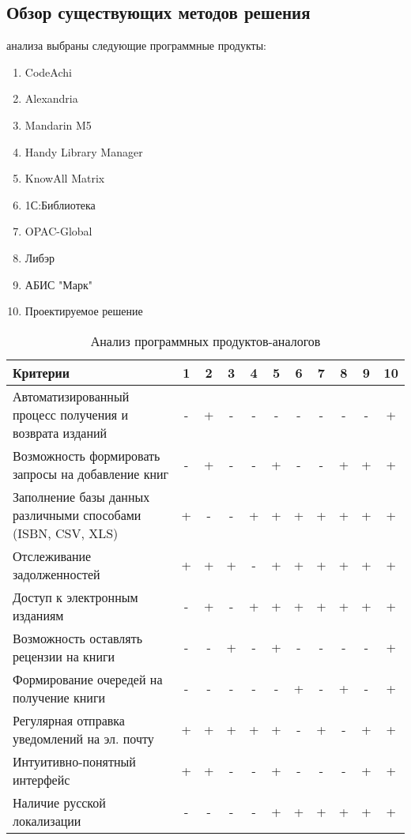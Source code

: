 \documentclass[./intro.tex]{subfiles}
\begin{document}
\subsection{Обзор существующих методов решения}
 анализа выбраны следующие программные продукты:
\begin{enumerate}
    \item CodeAchi \cite{Codeachi}
    \item Alexandria \cite{Alexandria}
    \item Mandarin M5 \cite{Mandarin}
    \item Handy Library Manager \cite{Handy}
    \item KnowAll Matrix \cite{KnowAll}
    \item 1С:Библиотека \cite{1C}
    \item OPAC-Global \cite{OPAC}
    \item Либэр \cite{Liber}
    \item АБИС "Марк" \cite{ABISmark}
    \item Проектируемое решение
\end{enumerate}

\begin{table}[h]
    \caption{Анализ программных продуктов-аналогов}
    \label{table:1}
    \begin{tabular}{|p{8.5cm}|c|c|c|c|c|c|c|c|c|c|}
        \hline
        Критерии & 1 & 2 & 3 & 4 & 5 & 6 & 7 & 8 & 9 & 10\\
        \hline
        Автоматизированный процесс получения и возврата изданий & - & + & - & - & - & - & - & - & - & + \\
        \hline
        Возможность формировать запросы на добавление книг & - & + & - & - & + & - & - & + & + & + \\
        \hline
        Заполнение базы данных различными способами (ISBN, CSV, XLS) & + & - & - & + & + & + & + & + & + & + \\
        \hline
        Отслеживание задолженностей & + & + & + & - & + & + & + & + & + & + \\
        \hline
        Доступ к электронным изданиям & - & + & - & + & + & + & + & + & + & + \\
        \hline
        Возможность оставлять рецензии на книги & - & - & + & - & + & - & - & - & - & + \\
        \hline
        Формирование очередей на получение книги & - & - & - & - & - & + & - & + & - & + \\
        \hline
        Регулярная отправка уведомлений на эл. почту & + & + & + & + & + & - & + & - & + & + \\
        \hline
        Интуитивно-понятный интерфейс & + & + & - & - & + & - & - & - & + & + \\
        \hline
        Наличие русской локализации & - & - & - & - & + & + & + & + & + & + \\
        \hline
    \end{tabular}    
\end{table}
\end{document}
